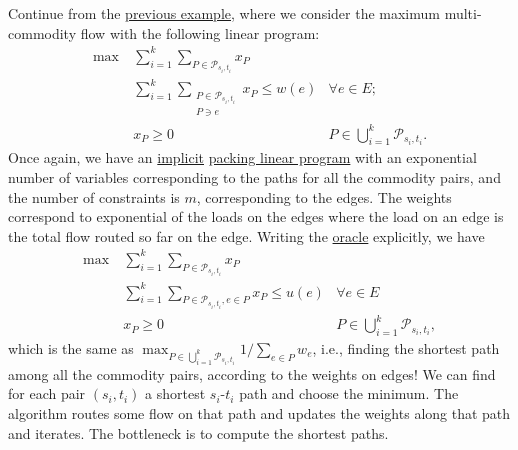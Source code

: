\begin{eg}
	Continue from the \hyperref[eg:maximum-multi-commodity-flow-MWU]{previous example}, where we consider the maximum multi-commodity flow with the following linear program:
	\[
		\begin{aligned}
			\max~ & \sum_{i=1}^{k} \sum_{P \in \mathcal{P} _{s_i, t_i}} x_P                                                         \\
			      & \sum_{i=1}^{k} \sum_{\substack{P \in\mathcal{P} _{s_i, t_i}                                                     \\ P \ni e}} x_P \leq w(e) & \forall e \in E ;                                  \\
			      & x_P \geq 0                                                  & P \in \bigcup_{i=1}^{k} \mathcal{P} _{s_i, t_i} .
		\end{aligned}
	\]
	Once again, we have an \hyperref[def:implicit-LP]{implicit} \hyperref[def:packing-LP]{packing linear program} with an exponential number of variables corresponding to the paths for all the commodity pairs, and the number of constraints is \(m\), corresponding to the edges. The weights correspond to exponential of the loads on the edges where the load on an edge is the total flow routed so far on the edge. Writing the \hyperref[eq:MWU-oracle-LP]{oracle} explicitly, we have
	\[
		\begin{aligned}
			\max~ & \sum_{i=1}^{k} \sum_{P \in \mathcal{P} _{s_i, t_i}} x_P                                                                       \\
			      & \sum_{i=1}^{k} \sum_{P \in \mathcal{P} _{s_i, t_i}, e \in P} x_P \leq u(e) & \forall e\in E                                   \\
			      & x_P \geq 0                                                                 & P \in \bigcup_{i=1}^{k} \mathcal{P} _{s_i, t_i},
		\end{aligned}
	\]
	which is the same as \(\max _{P \in \bigcup_{i=1}^{k} \mathcal{P} _{s_i, t_i}} 1 / \sum_{e \in P} w_e\), i.e., finding the shortest path among all the commodity pairs, according to the weights on edges! We can find for each pair \((s_i, t_i)\) a shortest \(s_i\)-\(t_i\) path and choose the minimum. The algorithm routes some flow on that path and updates the weights along that path and iterates. The bottleneck is to compute the shortest paths.
\end{eg}